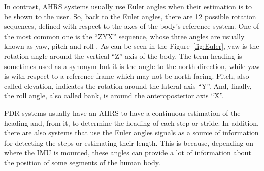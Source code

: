 In contrast, AHRS systems usually use Euler angles when their estimation is to be shown to the user.
So, back to the Euler angles, there are 12 possible rotation sequences, defined with respect to the axes of the body's reference system. 
One of the most common one is the ``ZYX'' sequence, whose three angles are usually known as yaw, pitch and roll \cite{noauthor_ieee_2009}.
As can be seen in the Figure~\ref{fig:Euler}, yaw is the rotation angle around the vertical ``Z'' axis of the body. The term heading is sometimes used as a synonym but it is the angle to the north direction, while yaw is with respect to a reference frame which may not be north-facing.
Pitch, also called elevation, indicates the rotation around the lateral axis ``Y''.
And, finally, the roll angle, also called bank, is around the anteroposterior axis ``X''.

PDR systems usually have an AHRS to have a continuous estimation of the heading and, from it, to determine the heading of each step or stride.
In addition, there are also systems that use the Euler angles signals as a source of information for detecting the steps or estimating their length. This is because, depending on where the IMU is mounted, these angles can provide a lot of information about the position of some segments of the human body.